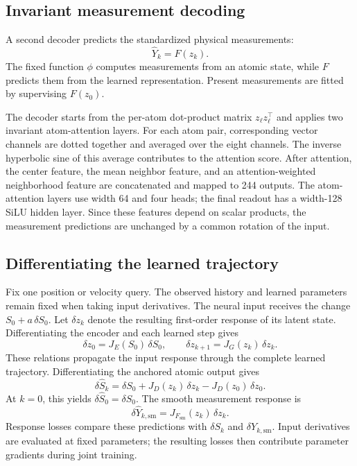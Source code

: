 \documentclass[11pt,a4paper]{article}
\numberwithin{equation}{section}
\newcommand{\sm}{\mathrm{sm}}
\begin{document}
\subsection{Invariant measurement decoding}

A second decoder predicts the standardized physical measurements:
\begin{equation}
\boxed{\widehat Y_k=F(z_k).}
\label{eq:measurement-readout}
\end{equation}
The fixed function $\phi$ computes measurements from an atomic state, while
$F$ predicts them from the learned representation. Present measurements
are fitted by supervising $F(z_0)$.

The decoder starts from the per-atom dot-product matrix $z_\ell z_\ell^\top$
and applies two invariant atom-attention layers. For each atom pair,
corresponding vector channels are dotted together and averaged over the
eight channels. The inverse hyperbolic sine of this average contributes to
the attention score. After attention, the center feature, the mean neighbor
feature, and an attention-weighted neighborhood feature are concatenated
and mapped to 244 outputs. The atom-attention layers use width 64 and four
heads; the final readout has a width-128 SiLU hidden layer. Since these
features depend on scalar products, the measurement predictions are
unchanged by a common rotation of the input.

\subsection{Differentiating the learned trajectory}

Fix one position or velocity query. The observed history and learned
parameters remain fixed when taking input derivatives. The neural input
receives the change $S_0+a\,\delta S_0$. Let $\delta z_k$ denote the resulting
first-order response of its latent state. Differentiating the encoder and
each learned step gives
\begin{equation}
\boxed{\delta z_0=J_E(S_0)\,\delta S_0,\qquad
\delta z_{k+1}=J_G(z_k)\,\delta z_k.}
\end{equation}
These relations propagate the input response through the complete learned
trajectory. Differentiating the anchored atomic output gives
\begin{equation}
\delta\widehat S_k
=\delta S_0+J_D(z_k)\,\delta z_k-J_D(z_0)\,\delta z_0.
\label{eq:student-u}
\end{equation}
At $k=0$, this yields $\delta\widehat S_0=\delta S_0$.
The smooth measurement response is
\begin{equation}
\delta\widehat Y_{k,\sm}=J_{F_{\sm}}(z_k)\,\delta z_k.
\label{eq:student-R}
\end{equation}
Response losses compare these predictions with $\delta S_k$ and
$\delta Y_{k,\sm}$. Input derivatives are evaluated at fixed parameters;
the resulting losses then contribute parameter gradients during joint training.
\end{document}
